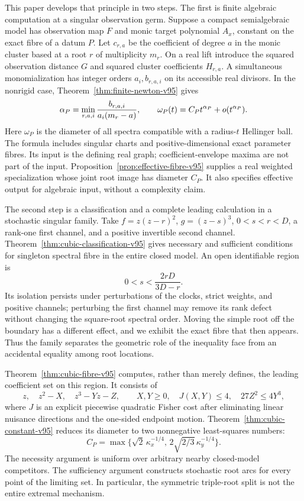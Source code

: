 \documentclass[11pt,reqno]{amsart}
\numberwithin{equation}{section}
\theoremstyle{definition}\newtheorem{definition}[theorem]{Definition}
\theoremstyle{remark}\newtheorem{remark}[theorem]{Remark}
\begin{document}
This paper develops that principle in two steps. The first is finite
algebraic computation at a singular observation germ. Suppose a compact
semialgebraic model has observation map $F$ and monic target polynomial
$A_x$, constant on the exact fibre of a datum $P$. Let $c_{r,a}$ be the
coefficient of degree $a$ in the monic cluster based at a root $r$ of
multiplicity $m_r$. On a real lift introduce the squared observation
distance $G$ and squared cluster coefficients $H_{r,a}$. A simultaneous
monomialization has integer orders $a_i,b_{r,a,i}$ on its accessible
real divisors. In the nonrigid case, Theorem~\ref{thm:finite-newton-v95} gives
\[
 \alpha_P=\min_{r,a,i}{b_{r,a,i}\over a_i(m_r-a)},\qquad
 \omega_P(t)=C_Pt^{\alpha_P}+o(t^{\alpha_P}).
\]
Here $\omega_P$ is the diameter of all spectra compatible with a
radius-$t$ Hellinger ball. The formula includes singular charts and
positive-dimensional exact parameter fibres. Its input is the defining
real graph; coefficient-envelope maxima are not part of the input.
Proposition~\ref{prop:effective-fibre-v95} supplies a real weighted
specialization whose joint root image has diameter $C_P$. It also
specifies effective output for algebraic input, without a complexity
claim.

The second step is a classification and a complete leading calculation
in a stochastic singular family. Take
$f=z(z-r)^2$, $g=(z-s)^3$, $0<s<r<D$, a rank-one first channel,
and a positive invertible second channel. Theorem~\ref{thm:cubic-classification-v95}
gives necessary and sufficient conditions for singleton spectral fibre
in the entire closed model. An open identifiable region is
\[
 0<s<\frac{2rD}{3D-r}.
\]
Its isolation persists under perturbations of the clocks, strict weights,
and positive channels; perturbing the first channel may remove its rank
defect without changing the square-root spectral order. Moving the simple
root off the boundary has a different effect, and we exhibit the exact
fibre that then appears. Thus the family separates the geometric role
of the inequality face from an accidental equality among root locations.

Theorem~\ref{thm:cubic-fibre-v95} computes, rather than merely defines,
the leading coefficient set on this region. It consists of
\[
 z,\quad z^2-X,\quad z^3-Yz-Z,
 \qquad X,Y\ge0,\quad J(X,Y)\le4,\quad27Z^2\le4Y^3,
\]
where $J$ is an explicit piecewise quadratic Fisher cost after eliminating
linear nuisance directions and the one-sided endpoint motion.
Theorem~\ref{thm:cubic-constant-v95} reduces its diameter to two
nonnegative least-squares numbers:
\[
 C_P=\max\{\sqrt2\,\kappa_x^{-1/4},\,2\sqrt{2/3}\,\kappa_y^{-1/4}\}.
\]
The necessity argument is uniform over arbitrary nearby closed-model
competitors. The sufficiency argument constructs stochastic root arcs
for every point of the limiting set. In particular, the symmetric
triple-root split is not the entire extremal mechanism.
\end{document}
